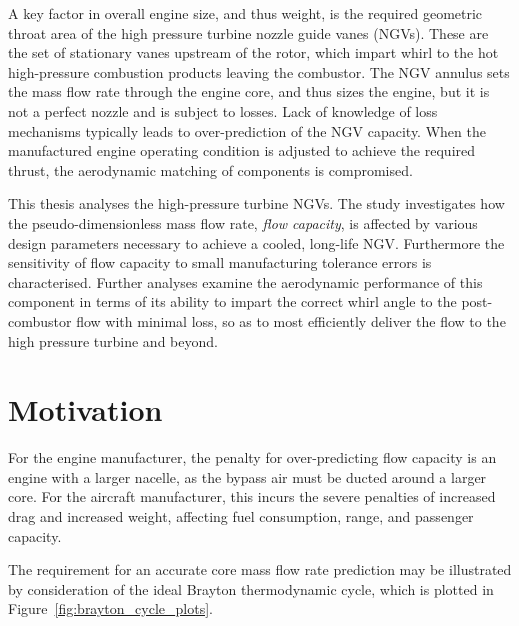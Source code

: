 \documentclass[a4paper, 11pt, oneside]{report}
\begin{document}
A key factor in overall engine size, and thus weight, is the required geometric throat area of the high pressure turbine nozzle guide vanes (NGVs). These are the set of stationary vanes upstream of the rotor, which impart whirl to the hot high-pressure combustion products leaving the combustor. The NGV annulus sets the mass flow rate through the engine core, and thus sizes the engine, but it is not a perfect nozzle and is subject to losses. Lack of knowledge of loss mechanisms typically leads to over-prediction of the NGV capacity. When the manufactured engine operating condition is adjusted to achieve the required thrust, the aerodynamic matching of components is compromised.

This thesis analyses the high-pressure turbine NGVs. The study investigates how the pseudo-dimensionless mass flow rate, \textit{flow capacity}, is affected by various design parameters necessary to achieve a cooled, long-life NGV. Furthermore the sensitivity of flow capacity to small manufacturing tolerance errors is characterised. Further analyses examine the aerodynamic performance of this component in terms of its ability to impart the correct whirl angle to the post-combustor flow with minimal loss, so as to most efficiently deliver the flow to the high pressure turbine and beyond.



\section{Motivation}

For the engine manufacturer, the penalty for over-predicting flow capacity is an engine with a larger nacelle, as the bypass air must be ducted around a larger core. For the aircraft manufacturer, this incurs the severe penalties of increased drag and increased weight, affecting fuel consumption, range, and passenger capacity.

The requirement for an accurate core mass flow rate prediction may be illustrated by consideration of the ideal Brayton thermodynamic cycle, which is plotted in Figure~\ref{fig:brayton_cycle_plots}.
\end{document}
